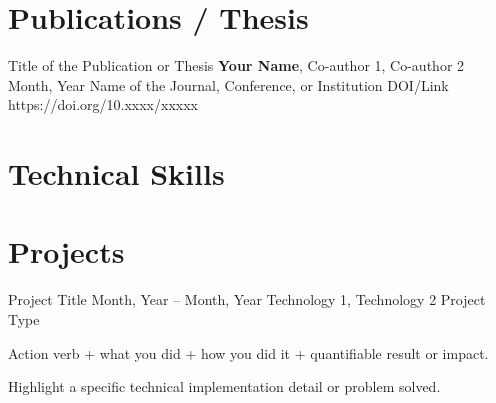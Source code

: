 \documentclass[11pt, a4paper]{article}
\begin{document}

\section{Publications / Thesis}
\resumePublication
    {Title of the Publication or Thesis}
    {\textbf{Your Name}, Co-author 1, Co-author 2}
    {Month, Year}
    {Name of the Journal, Conference, or Institution}
    {DOI/Link}
    {https://doi.org/10.xxxx/xxxxx}


\section{Technical Skills}


\section{Projects}
\resumeProject
    {Project Title}
    {Month, Year – Month, Year}
    {Technology 1, Technology 2}
    {Project Type}
    {
        \item Action verb + what you did + how you did it + quantifiable result or impact.
        \item Highlight a specific technical implementation detail or problem solved.
    }

\end{document}
